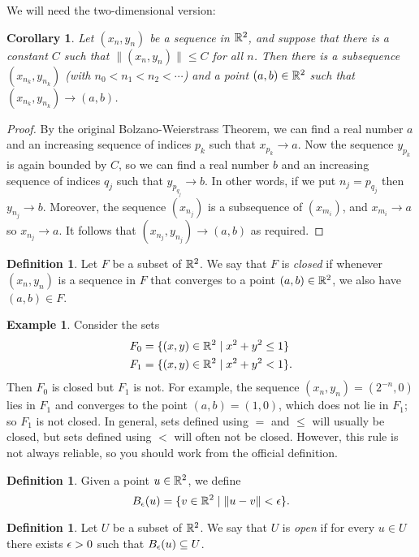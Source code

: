 \documentclass[reqno]{amsart}
\newtheorem{corollary}[theorem]{Corollary}
\theoremstyle{definition}
\newtheorem{definition}[theorem]{Definition}
\newtheorem{example}[theorem]{Example}
\begin{document}
We will need the two-dimensional version:
\begin{corollary}
 Let $(x_n,y_n)$ be a sequence in ${\mathbb{R}}^2$, and suppose that there is
 a constant $C$ such that $\|(x_n,y_n)\|\leq C$ for all $n$.  Then
 there is a subsequence $(x_{n_k},y_{n_k})$ (with
 $n_0<n_1<n_2<\dotsb $) and a point $(a,b)\in{\mathbb{R}}^2$ such that
 $(x_{n_k},y_{n_k})\to(a,b)$. 
\end{corollary}
\begin{proof}
 By the original Bolzano-Weierstrass Theorem, we can find a real
 number $a$ and an increasing sequence of indices $p_k$ such that
 $x_{p_k}\to a$.  Now the sequence $y_{p_k}$ is again bounded by $C$,
 so we can find a real number $b$ and an increasing sequence of
 indices $q_j$ such that $y_{p_{q_j}}\to b$.  In other words, if we
 put $n_j=p_{q_j}$ then $y_{n_j}\to b$.  Moreover, the sequence
 $(x_{n_j})$ is a subsequence of $(x_{m_i})$, and $x_{m_i}\to a$ so
 $x_{n_j}\to a$.  It follows that $(x_{n_j},y_{n_j})\to(a,b)$ as
 required. 
\end{proof}

\begin{definition}
 Let $F$ be a subset of ${\mathbb{R}}^2$.  We say that $F$ is \emph{closed} if
 whenever $(x_n,y_n)$ is a sequence in $F$ that converges to a point
 $(a,b)\in{\mathbb{R}}^2$, we also have $(a,b)\in F$.
\end{definition}

\begin{example}
 Consider the sets 
 \begin{align*}
  F_0 &= \{(x,y)\in{\mathbb{R}}^2\;|\; x^2+y^2\leq 1\} \\
  F_1 &= \{(x,y)\in{\mathbb{R}}^2\;|\; x^2+y^2< 1\}.
 \end{align*}
 Then $F_0$ is closed but $F_1$ is not.  For example, the sequence
 $(x_n,y_n)=(2^{-n},0)$ lies in $F_1$ and converges to the point
 $(a,b)=(1,0)$, which does not lie in $F_1$; so $F_1$ is not closed.
 In general, sets defined using $=$ and $\leq$ will usually be closed,
 but sets defined using $<$ will often not be closed.  However, this
 rule is not always reliable, so you should work from the official
 definition. 
\end{example}

\begin{definition}
 Given a point $u\in{\mathbb{R}}^2$, we define 
 \[ B_{\epsilon}(u) = \{v\in{\mathbb{R}}^2\;|\; \|u-v\|<\epsilon\}. \]
\end{definition}

\begin{definition}
 Let $U$ be a subset of ${\mathbb{R}}^2$.  We say that $U$ is \emph{open} if for
 every $u\in U$ there exists $\epsilon>0$ such that $B_\epsilon(u)\subseteq U$.
\end{definition}
\end{document}
